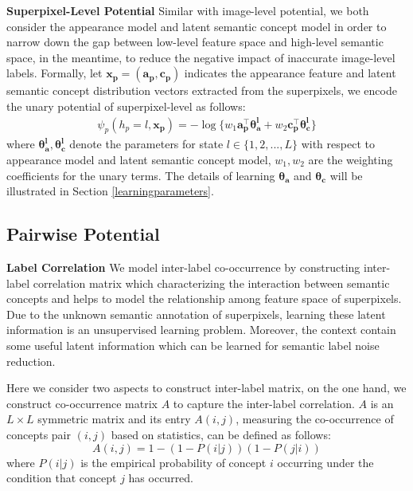 \textbf{Superpixel-Level Potential}
Similar with image-level potential, we both consider the appearance model and latent semantic concept model in order to narrow down the gap between low-level feature space and high-level semantic space, in the meantime, to reduce the negative impact of inaccurate image-level labels.
Formally, let $\boldsymbol{x_p} = (\boldsymbol{a_p},\boldsymbol{c_p})$ indicates the appearance feature and latent semantic concept distribution vectors extracted from the superpixels, we encode the unary potential of superpixel-level as follows:
\begin{equation}
    \begin{aligned}
        \psi_{p}(h_p=l,\boldsymbol{x_p}) = - \log \big\{ w_1 \boldsymbol{a_p^\top}\boldsymbol{\theta_a^l}
        + w_2 \boldsymbol{c_p^\top}\boldsymbol{\theta_c^l} \big\}
    \end{aligned}
    \label{eq:local}
\end{equation}
where $\boldsymbol{\theta_a^l}, \boldsymbol{\theta_c^l}$ denote the parameters for state $l \in \{1,2,...,L\}$ with respect to appearance model and latent semantic concept model, $w_1,w_2$ are the weighting coefficients for the unary terms.
The details of learning $\boldsymbol{\theta_a}$ and $\boldsymbol{\theta_c}$ will be illustrated in Section \ref{learningparameters}.

\subsection{Pairwise Potential}

\textbf{Label Correlation}
We model inter-label co-occurrence by constructing inter-label correlation matrix which characterizing the interaction between semantic concepts and helps to model the relationship among feature space of superpixels.
Due to the unknown semantic annotation of superpixels, learning these latent information is an unsupervised learning problem.
Moreover, the context contain some useful latent information which can be learned for semantic label noise reduction.

Here we consider two aspects to construct inter-label matrix, on the one hand, we construct co-occurrence matrix $A$ to capture the inter-label correlation. $A$ is an $L \times L$ symmetric matrix and its entry $A(i,j)$, measuring the co-occurrence of concepts pair $(i,j)$ based on statistics, can be defined as follows:
\begin{equation}
    A(i,j) = 1-(1-P(i|j))(1-P(j|i))
\end{equation}
where $P(i|j)$ is the empirical probability of concept $i$ occurring under the condition that concept $j$ has occurred.

